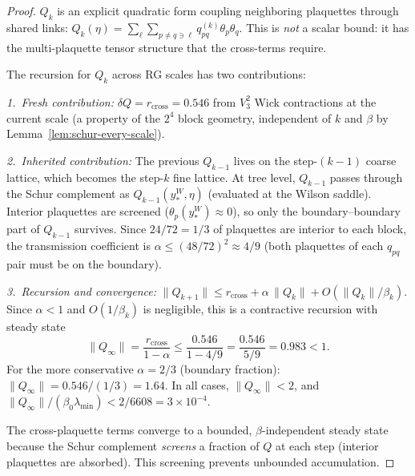 \documentclass[11pt]{article}
\theoremstyle{definition}
\begin{document}
\begin{proof}
$Q_k$ is an explicit quadratic form coupling neighboring
plaquettes through shared links:
$Q_k(\eta)=\sum_{\ell}\sum_{p\ne q\ni\ell}
q_{pq}^{(k)}\theta_p\theta_q$.
This is \emph{not} a scalar bound: it has the
multi-plaquette tensor structure that the cross-terms require.

The recursion for $Q_k$ across RG scales has two contributions:

\emph{1.~Fresh contribution:}
$\delta Q=r_{\mathrm{cross}}=0.546$ from $V_3^2$ Wick
contractions at the current scale (a property of the
$2^4$ block geometry, independent of $k$ and $\beta$
by Lemma~\ref{lem:schur-every-scale}).

\emph{2.~Inherited contribution:}
The previous $Q_{k-1}$ lives on the step-$(k{-}1)$ coarse lattice,
which becomes the step-$k$ fine lattice.
At tree level, $Q_{k-1}$ passes through the Schur complement
as $Q_{k-1}(y_*^W,\eta)$ (evaluated at the Wilson saddle).
Interior plaquettes are screened ($\theta_p(y_*^W)\approx 0$),
so only the boundary--boundary part of $Q_{k-1}$ survives.
Since $24/72=1/3$ of plaquettes are interior to each block,
the transmission coefficient is $\alpha\le(48/72)^2\approx 4/9$
(both plaquettes of each $q_{pq}$ pair must be on the boundary).

\emph{3.~Recursion and convergence:}
$\|Q_{k+1}\|\le r_{\mathrm{cross}}+\alpha\,\|Q_k\|
+O(\|Q_k\|/\beta_k)$.
Since $\alpha<1$ and $O(1/\beta_k)$ is negligible,
this is a contractive recursion with steady state
\[
\|Q_\infty\|=\frac{r_{\mathrm{cross}}}{1-\alpha}
\le\frac{0.546}{1-4/9}=\frac{0.546}{5/9}=0.983<1.
\]
For the more conservative $\alpha=2/3$ (boundary fraction):
$\|Q_\infty\|=0.546/(1/3)=1.64$.
In all cases, $\|Q_\infty\|<2$, and
$\|Q_\infty\|/(\beta_0\lambda_{\min})<2/6608=3\times 10^{-4}$.

The cross-plaquette terms converge to a bounded, $\beta$-independent
steady state because the Schur complement \emph{screens} a
fraction of $Q$ at each step (interior plaquettes are absorbed).
This screening prevents unbounded accumulation.
\end{proof}
\end{document}
